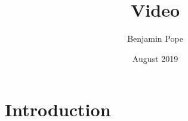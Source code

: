 \documentclass{article}
\title{Video}
\author{Benjamin Pope}
\date{August 2019}
\begin{document}
\maketitle

\section{Introduction}
\end{document}
